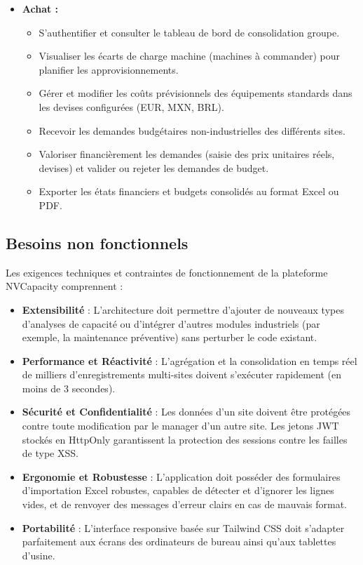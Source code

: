 \begin{itemize}
    \item [$-$] \textbf{Achat :}
    \begin{itemize}[label=\textbullet,font=\normalsize]
        \item S'authentifier et consulter le tableau de bord de consolidation groupe.
        \item Visualiser les écarts de charge machine (machines à commander) pour planifier les approvisionnements.
        \item Gérer et modifier les coûts prévisionnels des équipements standards dans les devises configurées (EUR, MXN, BRL).
        \item Recevoir les demandes budgétaires non-industrielles des différents sites.
        \item Valoriser financièrement les demandes (saisie des prix unitaires réels, devises) et valider ou rejeter les demandes de budget.
        \item Exporter les états financiers et budgets consolidés au format Excel ou PDF.
    \end{itemize}
\end{itemize}

\subsection{Besoins non fonctionnels}

Les exigences techniques et contraintes de fonctionnement de la plateforme NVCapacity comprennent :

\begin{itemize}[label=\textbullet,font=\normalsize]
    \item \textbf{Extensibilité} : L'architecture doit permettre d'ajouter de nouveaux types d'analyses de capacité ou d'intégrer d'autres modules industriels (par exemple, la maintenance préventive) sans perturber le code existant.
    \item \textbf{Performance et Réactivité} : L'agrégation et la consolidation en temps réel de milliers d'enregistrements multi-sites doivent s'exécuter rapidement (en moins de 3 secondes).
    \item \textbf{Sécurité et Confidentialité} : Les données d'un site doivent être protégées contre toute modification par le manager d'un autre site. Les jetons JWT stockés en HttpOnly garantissent la protection des sessions contre les failles de type XSS.
    \item \textbf{Ergonomie et Robustesse} : L'application doit posséder des formulaires d'importation Excel robustes, capables de détecter et d'ignorer les lignes vides, et de renvoyer des messages d'erreur clairs en cas de mauvais format.
    \item \textbf{Portabilité} : L'interface responsive basée sur Tailwind CSS doit s'adapter parfaitement aux écrans des ordinateurs de bureau ainsi qu'aux tablettes d'usine.
\end{itemize}

